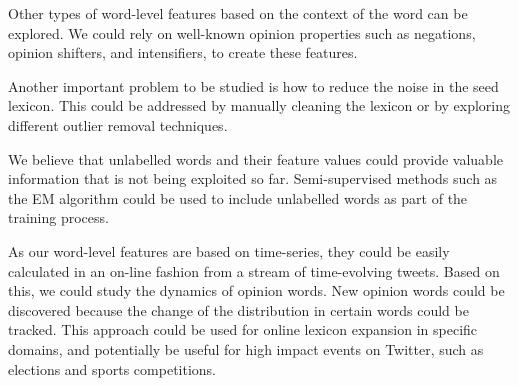 \documentclass{sig-alternate}
\begin{document}
Other types of word-level features based on the context of the word can be explored. We could rely on well-known opinion properties such as negations, opinion shifters, and intensifiers, to create these features.

Another important problem to be studied is how to reduce the noise in the seed lexicon. This could be addressed by manually cleaning the lexicon or by exploring different outlier removal techniques.

We believe that unlabelled words and their feature values could provide valuable information that is not being exploited so far. Semi-supervised methods such as the EM algorithm \cite{nigam2006semi} could be used to include unlabelled words as part of the training process. 

As our word-level features are based on time-series, they could be easily calculated in an on-line fashion from a stream of time-evolving tweets. Based on this, we could study the dynamics of opinion words. New opinion words could be discovered because the change of the distribution in certain words could be tracked. This approach could be used for online lexicon expansion in specific domains, and potentially be useful for high impact events on Twitter, such as elections and sports competitions.




\end{document}
